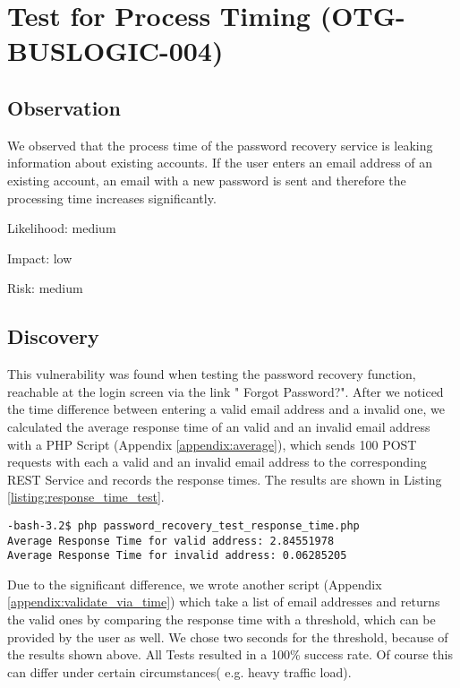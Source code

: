 \chapter{Test for Process Timing (OTG-BUSLOGIC-004)}
\section{Observation}
	We observed that the process time of the password recovery service is leaking information about existing accounts.
	If the user enters an email address of an existing account, an email with a new password is sent and therefore the processing time increases significantly.


Likelihood: medium \newline

Impact: low\newline

Risk: medium\newline

\section{Discovery}
This vulnerability was found when testing the password recovery function, reachable at the login screen via the link " Forgot Password?".
After we noticed the time difference between entering a valid email address and a invalid one, we calculated the average response time of an valid and an invalid email address with a PHP Script (Appendix \ref{appendix:average}), which sends  100 POST requests with each a valid and an invalid email address to the corresponding REST Service and records the response times. The results are shown in Listing \ref{listing:response_time_test}.

\begin{lstlisting}[caption= Results of Testing Respone Time of Password Receovery ,label=listing:response_time_test]
-bash-3.2$ php password_recovery_test_response_time.php 
Average Response Time for valid address: 2.84551978
Average Response Time for invalid address: 0.06285205
\end{lstlisting}

Due to the significant difference, we wrote another script (Appendix \ref{appendix:validate_via_time}) which take a list of email addresses and returns the valid ones by comparing the response time with a threshold, which can be provided by the user as well. We chose two seconds for the threshold, because of the results shown above. All Tests resulted in a 100\% success rate. Of course this can differ under certain circumstances( e.g. heavy traffic load). 

